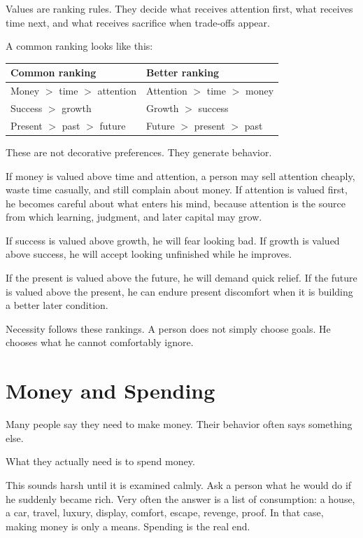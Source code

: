 Values are ranking rules. They decide what receives attention first, what receives time next, and what receives sacrifice when trade-offs appear.

A common ranking looks like this:

\begin{center}
\begin{tabular}{ll}
\hline
Common ranking & Better ranking \\
\hline
Money $>$ time $>$ attention & Attention $>$ time $>$ money \\
Success $>$ growth & Growth $>$ success \\
Present $>$ past $>$ future & Future $>$ present $>$ past \\
\hline
\end{tabular}
\end{center}

These are not decorative preferences. They generate behavior.

If money is valued above time and attention, a person may sell attention cheaply, waste time casually, and still complain about money. If attention is valued first, he becomes careful about what enters his mind, because attention is the source from which learning, judgment, and later capital may grow.

If success is valued above growth, he will fear looking bad. If growth is valued above success, he will accept looking unfinished while he improves.

If the present is valued above the future, he will demand quick relief. If the future is valued above the present, he can endure present discomfort when it is building a better later condition.

Necessity follows these rankings. A person does not simply choose goals. He chooses what he cannot comfortably ignore.

\section*{Money and Spending}

Many people say they need to make money. Their behavior often says something else.

What they actually need is to spend money.

This sounds harsh until it is examined calmly. Ask a person what he would do if he suddenly became rich. Very often the answer is a list of consumption: a house, a car, travel, luxury, display, comfort, escape, revenge, proof. In that case, making money is only a means. Spending is the real end.

